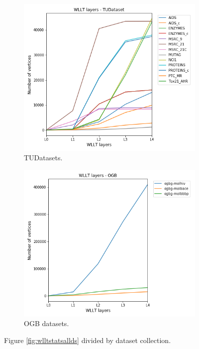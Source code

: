 		
	\begin{figure}[H]
		\centering
		\begin{subfigure}{0.45\textwidth}
			\centering
			\includegraphics[width=1.\linewidth]{images/WLLTstats_TUDs}
			\caption{TUDatasets.}
			\label{fig:wlltstatstuds}
		\end{subfigure}
		\begin{subfigure}{0.45\textwidth}
			\centering
			\includegraphics[width=1.\linewidth]{images/WLLTstats_OgbDs}
			\caption{OGB datasets.}
			\label{fig:wlltstatsogbds}
		\end{subfigure}
		\caption{Figure \ref{fig:wlltstatsallds} divided by dataset collection.}
		\label{fig:wlltstatstudsandogbds}
	\end{figure}
	
